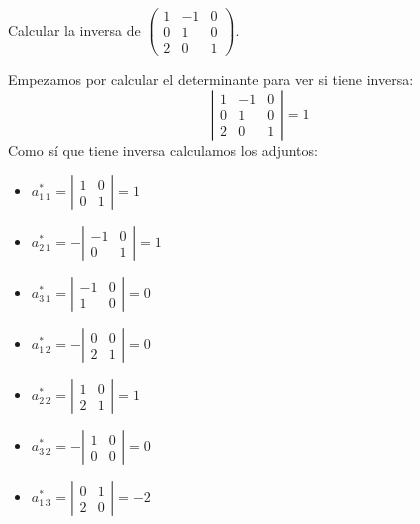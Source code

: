 \documentclass[a4paper,11pt,answers]{exam}
\newcommand\adjunto[1]{#1^\text{*}}
\begin{document}
\begin{questions}
\question Calcular la inversa de $\left(\begin{array}{rrr}
	1&-1&0\\
	0&1&0\\
	2&0&1
\end{array}\right)$.
\begin{solution}
\begin{small}
Empezamos por calcular el determinante para ver si tiene inversa:
\[\left|\begin{array}{rrr}
	1&-1&0\\
	0&1&0\\
	2&0&1
\end{array}\right| = 1\]
Como sí que tiene inversa calculamos los adjuntos:
\begin{multicols}{3}
	\begin{itemize}
		\item $\adjunto{a_{1\,1}} = \left|\begin{array}{rr}
			1&0\\
			0&1
		\end{array}\right| = 1$
		\item $\adjunto{a_{2\,1}} = -\left|\begin{array}{rr}
		-1&0\\
		0&1
	\end{array}\right| = 1$
		\item $\adjunto{a_{3\,1}} = \left|\begin{array}{rr}
			-1&0\\
			1&0
		\end{array}\right| = 0$
		\item $\adjunto{a_{1\,2}} = -\left|\begin{array}{rr}
			0&0\\
			2&1
		\end{array}\right| = 0$
		\item $\adjunto{a_{2\,2}} = \left|\begin{array}{rr}
			1&0\\
			2&1
		\end{array}\right| = 1$
		\item $\adjunto{a_{3\,2}} = -\left|\begin{array}{rr}
			1&0\\
			0&0
		\end{array}\right| = 0$
		\item $\adjunto{a_{1\,3}} = \left|\begin{array}{rr}
			0&1\\
			2&0
		\end{array}\right| = -2$

\end{itemize}
\end{multicols}
\end{small}
\end{solution}
\end{questions}
\end{document}
